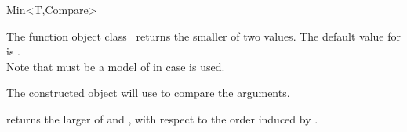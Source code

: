 \begin{ccRefFunctionObjectClass}{Min<T,Compare>}

\ccDefinition

The function object class \ccRefName\ returns the smaller of two values.
The default value for  is .\\

Note that  must be a model of 
in case  is used. 
 

\ccIsModel
{}

\ccCreation
{}
\ccGlue
{}
        {The constructed object will use  to compare the arguments. }

\ccOperations
{}
{returns the larger of  and , 
with respect to the order induced by . }

\end{ccRefFunctionObjectClass}
